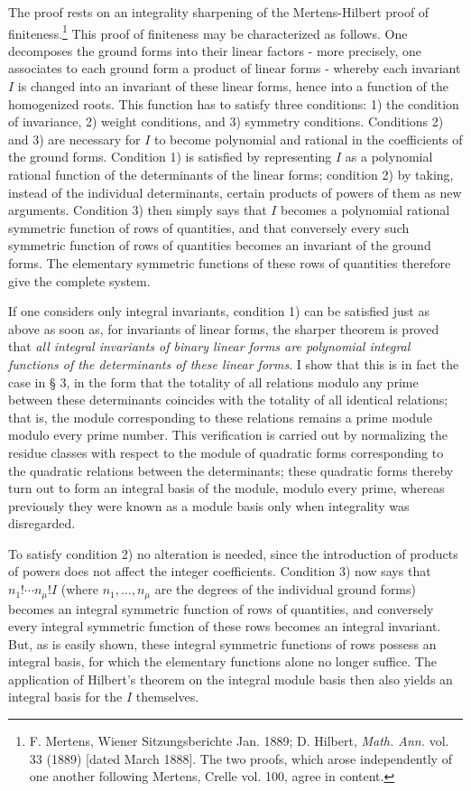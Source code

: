\documentclass[11pt]{article}
\begin{document}
The proof rests on an integrality sharpening of the Mertens-Hilbert proof of finiteness.\footnote{F. Mertens, Wiener Sitzungsberichte Jan. 1889; D. Hilbert, \emph{Math. Ann.} vol. 33 (1889) [dated March 1888]. The two proofs, which arose independently of one another following Mertens, Crelle vol. 100, agree in content.}
This proof of finiteness may be characterized as follows. One decomposes the ground forms into their linear factors - more precisely, one associates to each ground form a product of linear forms - whereby each invariant \(I\) is changed into an invariant of these linear forms, hence into a function of the homogenized roots. This function has to satisfy three conditions: 1) the condition of invariance, 2) weight conditions, and 3) symmetry conditions. Conditions 2) and 3) are necessary for \(I\) to become polynomial and rational in the coefficients of the ground forms. Condition 1) is satisfied by representing \(I\) as a polynomial rational function of the determinants of the linear forms; condition 2) by taking, instead of the individual determinants, certain products of powers of them as new arguments. Condition 3) then simply says that \(I\) becomes a polynomial rational symmetric function of rows of quantities, and that conversely every such symmetric function of rows of quantities becomes an invariant of the ground forms. The elementary symmetric functions of these rows of quantities therefore give the complete system.

If one considers only integral invariants, condition 1) can be satisfied just as above as soon as, for invariants of linear forms, the sharper theorem is proved that \emph{all integral invariants of binary linear forms are polynomial integral functions of the determinants of these linear forms}. I show that this is in fact the case in § 3, in the form that the totality of all relations modulo any prime between these determinants coincides with the totality of all identical relations; that is, the module corresponding to these relations remains a prime module modulo every prime number. This verification is carried out by normalizing the residue classes with respect to the module of quadratic forms corresponding to the quadratic relations between the determinants; these quadratic forms thereby turn out to form an integral basis of the module, modulo every prime, whereas previously they were known as a module basis only when integrality was disregarded.

To satisfy condition 2) no alteration is needed, since the introduction of products of powers does not affect the integer coefficients. Condition 3) now says that \(n_1!\cdots n_\mu! I\) (where \(n_1,\ldots,n_\mu\) are the degrees of the individual ground forms) becomes an integral symmetric function of rows of quantities, and conversely every integral symmetric function of these rows becomes an integral invariant. But, as is easily shown, these integral symmetric functions of rows possess an integral basis, for which the elementary functions alone no longer suffice. The application of Hilbert's theorem on the integral module basis then also yields an integral basis for the \(I\) themselves.
\end{document}
